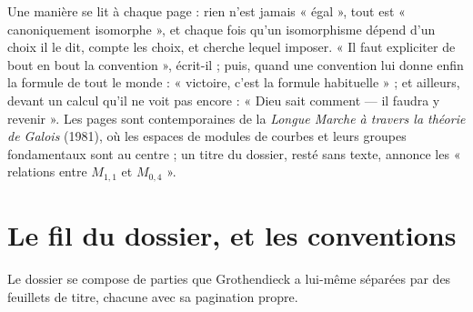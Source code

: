 \documentclass[11pt,a4paper]{article}
\begin{document}
\begin{resume}
Une manière se lit à chaque page : rien n'est jamais « égal », tout est
« canoniquement isomorphe », et chaque fois qu'un isomorphisme dépend d'un
choix il le dit, compte les choix, et cherche lequel imposer. « Il faut
expliciter de bout en bout la convention », écrit-il ; puis, quand une
convention lui donne enfin la formule de tout le monde : « victoire, c'est la
formule habituelle » ; et ailleurs, devant un calcul qu'il ne voit pas encore :
« Dieu sait comment --- il faudra y revenir ». Les pages sont contemporaines de
la \emph{Longue Marche à travers la théorie de Galois} (1981), où les espaces
de modules de courbes et leurs groupes fondamentaux sont au centre ; un titre
du dossier, resté sans texte, annonce les « relations entre $M_{1,1}$ et
$M_{0,4}$ ».

\end{resume}

\section*{Le fil du dossier, et les conventions}

Le dossier se compose de parties que Grothendieck a lui-même séparées par des
feuillets de titre, chacune avec sa pagination propre.
\end{document}
